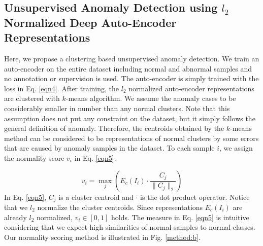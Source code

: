 \documentclass[conference]{IEEEtran}
\begin{document}
%



\subsection{Unsupervised Anomaly Detection using $l_2$ Normalized Deep Auto-Encoder Representations} 
\label{anomalymethod}
Here, we propose a clustering based unsupervised anomaly detection.
We train an auto-encoder on the entire dataset including normal and abnormal samples and no annotation or supervision is used.
The auto-encoder is simply trained with the loss in Eq. \ref{eqn4}.
After training, the $l_2$ normalized auto-encoder representations are clustered with $k$-means algorithm.
We assume the anomaly cases to be considerably smaller in number than any normal clusters.
Note that this assumption does not put any constraint on the dataset, but it simply follows the general definition of anomaly.
Therefore, the centroids obtained by the $k$-means method can be considered to be representations of normal clusters by some errors that are caused by anomaly samples in the dataset.
To each sample $i$, we assign the normality score $v_i$ in Eq. \ref{eqn5}.

\begin{equation}
\label{eqn5}
v_i=\max_{j} (E_c(I_i) \cdot \frac{C_j}{\lVert C_j \rVert_2})
\end{equation}
In Eq. \ref{eqn5}, $C_j$ is a cluster centroid and $\cdot$ is the dot product operator.
Notice that we $l_2$ normalize the cluster centroids.
Since representations $E_c(I_i)$ are already $l_2$ normalized, $v_i \in [0,1]$ holds.
The measure in Eq. \ref{eqn5} is intuitive considering that we expect high similarities of normal samples to normal classes.
Our normality scoring method is illustrated in Fig. \ref{method:b}.
\end{document}
